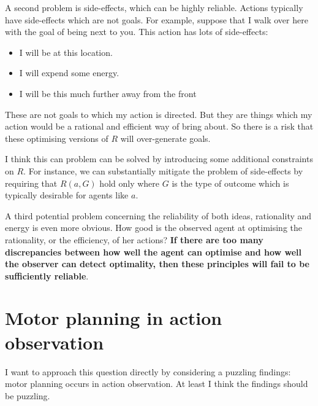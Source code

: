 \documentclass[12pt,\papersize]{extarticle}
\begin{document}
A second problem is side-effects, which can be highly reliable.
Actions typically have side-effects which are not goals.
For example,
suppose that I walk over here with the goal of being next to you.
This action has lots of side-effects: 
\begin{itemize}
\item 	I will be at this location.
\item	I will expend some energy.
\item	I will be this much further away from the front
\end{itemize}
These  are not goals to which my action is directed.
But they are things which my action would be a rational and efficient way of bring about.
So there is a risk that these optimising versions of $R$ will over-generate goals.

I think this can problem can be solved by introducing some additional constraints on $R$.
For instance, we can substantially mitigate the problem of side-effects by requiring that $R(a,G)$ hold only where $G$ is the type of outcome which is typically desirable for agents like $a$.


A third potential problem concerning the reliability of both ideas, rationality and energy is even more obvious.
How good is the observed agent at optimising the rationality, or the efficiency, of her actions?
\textbf{
If there are too many discrepancies between
		how well the agent can optimise 
	and
		how well the observer can detect optimality,
then these principles will fail to be sufficiently reliable}.






\section{Motor planning in action observation}

I want to approach this question directly by considering a puzzling findings:
motor planning occurs in action observation.
At least I think the findings should be puzzling.
\end{document}
